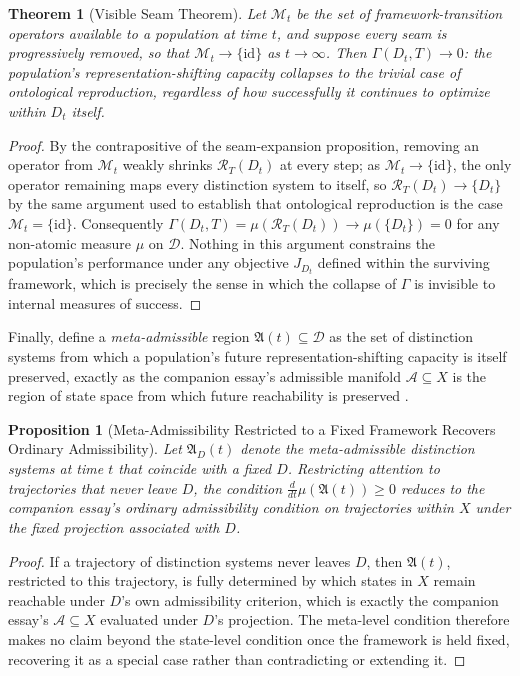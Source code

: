 \documentclass[11pt]{article}
\theoremstyle{plain}
\newtheorem{proposition}{Proposition}[section]
\newtheorem{theorem}{Theorem}[section]
\begin{document}
\begin{theorem}[Visible Seam Theorem]
Let $\mathcal{M}_t$ be the set of framework-transition operators available to a population at time $t$, and suppose every seam is progressively removed, so that $\mathcal{M}_t \to \{\mathrm{id}\}$ as $t \to \infty$. Then $\Gamma(D_t,T) \to 0$: the population's representation-shifting capacity collapses to the trivial case of ontological reproduction, regardless of how successfully it continues to optimize within $D_t$ itself.
\end{theorem}
\begin{proof}
By the contrapositive of the seam-expansion proposition, removing an operator from $\mathcal{M}_t$ weakly shrinks $\mathcal{R}_T(D_t)$ at every step; as $\mathcal{M}_t \to \{\mathrm{id}\}$, the only operator remaining maps every distinction system to itself, so $\mathcal{R}_T(D_t) \to \{D_t\}$ by the same argument used to establish that ontological reproduction is the case $\mathcal{M}_t = \{\mathrm{id}\}$. Consequently $\Gamma(D_t,T) = \mu(\mathcal{R}_T(D_t)) \to \mu(\{D_t\}) = 0$ for any non-atomic measure $\mu$ on $\mathcal{D}$. Nothing in this argument constrains the population's performance under any objective $J_{D_t}$ defined within the surviving framework, which is precisely the sense in which the collapse of $\Gamma$ is invisible to internal measures of success.
\end{proof}

\noindent Finally, define a \emph{meta-admissible} region $\mathfrak{A}(t) \subseteq \mathcal{D}$ as the set of distinction systems from which a population's future representation-shifting capacity is itself preserved, exactly as the companion essay's admissible manifold $\mathcal{A} \subseteq X$ is the region of state space from which future reachability is preserved \cite{flyxion2026cone}.

\begin{proposition}[Meta-Admissibility Restricted to a Fixed Framework Recovers Ordinary Admissibility]
Let $\mathfrak{A}_D(t)$ denote the meta-admissible distinction systems at time $t$ that coincide with a fixed $D$. Restricting attention to trajectories that never leave $D$, the condition $\frac{d}{dt}\mu(\mathfrak{A}(t)) \geq 0$ reduces to the companion essay's ordinary admissibility condition on trajectories within $X$ under the fixed projection associated with $D$.
\end{proposition}
\begin{proof}
If a trajectory of distinction systems never leaves $D$, then $\mathfrak{A}(t)$, restricted to this trajectory, is fully determined by which states in $X$ remain reachable under $D$'s own admissibility criterion, which is exactly the companion essay's $\mathcal{A} \subseteq X$ evaluated under $D$'s projection. The meta-level condition therefore makes no claim beyond the state-level condition once the framework is held fixed, recovering it as a special case rather than contradicting or extending it.
\end{proof}
\end{document}
